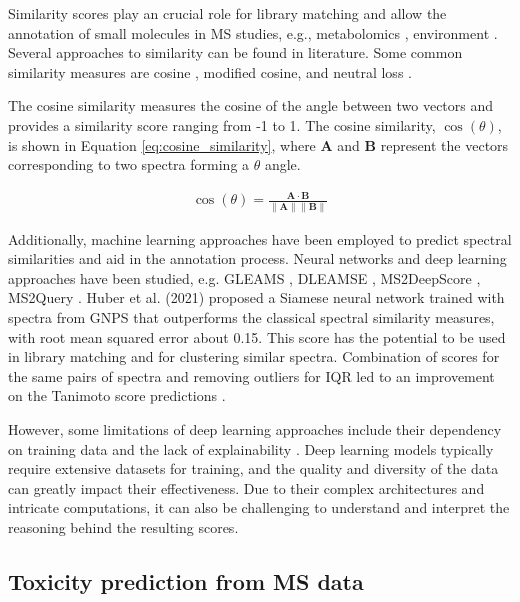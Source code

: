 Similarity scores play an crucial role for library matching and allow the annotation of small molecules in MS studies, e.g., metabolomics \cite{Cai2023}, environment \cite{Tang2022}\cite{Lestremau2023}.  Several approaches to similarity can be found in literature. Some common similarity measures are cosine \cite{naake_metcirc_2017}, modified cosine, and neutral loss \cite{bittremieux_comparison_2022}.

The cosine similarity measures the cosine of the angle between two vectors and provides a similarity score ranging from -1 to 1. The cosine similarity, $\cos(\theta)$, is shown in Equation \eqref{eq:cosine_similarity}, where $\mathbf{A}$ and $\mathbf{B}$ represent the vectors corresponding to two spectra forming a $\theta$ angle.

\begin{align}
\cos(\theta)=\frac{{\mathbf{A} \cdot \mathbf{B}}}{{\|\mathbf{A}\| \|\mathbf{B}\|}}
\label{eq:cosine_similarity}
\end{align}

Additionally, machine learning approaches have been employed to predict spectral similarities and aid in the annotation process. Neural networks and deep learning approaches have been studied, e.g. GLEAMS \cite{bittremieux_learned_2018}, DLEAMSE \cite{qin_deep_2021}, MS2DeepScore \cite{huber_MS2deepscore_2021}, MS2Query \cite{deJonge2023}. Huber et al. (2021) \cite{huber_MS2deepscore_2021} proposed a Siamese neural network trained with spectra from \ac{GNPS} that outperforms the classical spectral similarity measures, with root mean squared error about 0.15. This score has the potential to be used in library matching and for clustering similar spectra. Combination of scores for the same pairs of spectra and removing outliers for IQR led to an improvement on the Tanimoto score predictions \cite{huber_MS2deepscore_2021}. 

However, some limitations of deep learning approaches include their dependency on training data and the lack of explainability \cite{Idakwo2018}.  Deep learning models typically require extensive datasets for training, and the quality and diversity of the data can greatly impact their effectiveness. Due to their complex architectures and intricate computations, it can also be challenging to understand and interpret the reasoning behind the resulting scores. 

\subsection*{Toxicity prediction from MS data}

